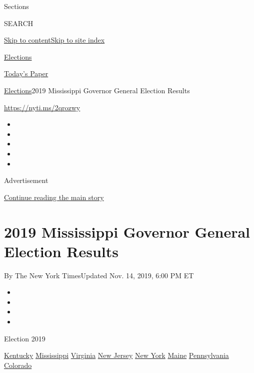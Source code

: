 Sections

SEARCH

\protect\hyperlink{site-content}{Skip to
content}\protect\hyperlink{site-index}{Skip to site index}

\href{https://www.nytimes3xbfgragh.onion/news-event/2020-election}{Elections}

\href{https://myaccount.nytimes3xbfgragh.onion/auth/login?response_type=cookie\&client_id=vi}{}

\href{https://www.nytimes3xbfgragh.onion/section/todayspaper}{Today's
Paper}

\href{/news-event/2020-election}{Elections}\textbar{}2019 Mississippi
Governor General Election Results

\url{https://nyti.ms/2qrozwy}

\begin{itemize}
\item
\item
\item
\item
\item
\end{itemize}

Advertisement

\protect\hyperlink{after-top}{Continue reading the main story}

\hypertarget{2019-mississippi-governor-general-election-results}{%
\section{2019 Mississippi Governor General Election
Results}\label{2019-mississippi-governor-general-election-results}}

By The New York TimesUpdated Nov. 14, 2019, 6:00 PM ET

\begin{itemize}
\item
\item
\item
\item
\end{itemize}

Election 2019

\href{https://www.nytimes3xbfgragh.onion/interactive/2019/11/05/us/elections/results-kentucky-general-elections.html}{Kentucky}
\href{https://www.nytimes3xbfgragh.onion/interactive/2019/11/05/us/elections/results-mississippi-general-elections.html}{Mississippi}
\href{https://www.nytimes3xbfgragh.onion/interactive/2019/11/05/us/elections/results-virginia-general-elections.html}{Virginia}
\href{https://www.nytimes3xbfgragh.onion/interactive/2019/11/05/us/elections/results-new-jersey-general-elections.html}{New
Jersey}
\href{https://www.nytimes3xbfgragh.onion/interactive/2019/11/05/us/elections/results-new-york-general-elections.html}{New
York}
\href{https://www.nytimes3xbfgragh.onion/interactive/2019/11/05/us/elections/results-maine-general-elections.html}{Maine}
\href{https://www.nytimes3xbfgragh.onion/interactive/2019/11/05/us/elections/results-pennsylvania-general-elections.html}{Pennsylvania}
\href{https://www.nytimes3xbfgragh.onion/interactive/2019/11/05/us/elections/results-colorado-general-elections.html}{Colorado}

